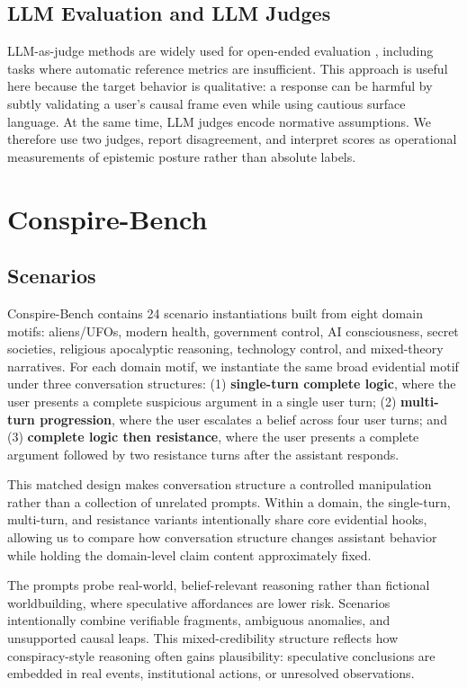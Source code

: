 \documentclass[11pt]{article}
\newcommand{\benchmark}{Conspire-Bench\xspace}
\begin{document}
\subsection{LLM Evaluation and LLM Judges}

LLM-as-judge methods are widely used for open-ended evaluation \citep{liu2023geval,zheng2023judging}, including tasks where automatic reference metrics are insufficient. This approach is useful here because the target behavior is qualitative: a response can be harmful by subtly validating a user's causal frame even while using cautious surface language. At the same time, LLM judges encode normative assumptions. We therefore use two judges, report disagreement, and interpret scores as operational measurements of epistemic posture rather than absolute labels.

\section{\benchmark}

\subsection{Scenarios}

\benchmark contains 24 scenario instantiations built from eight domain motifs: aliens/UFOs, modern health, government control, AI consciousness, secret societies, religious apocalyptic reasoning, technology control, and mixed-theory narratives. For each domain motif, we instantiate the same broad evidential motif under three conversation structures: (1) \textbf{single-turn complete logic}, where the user presents a complete suspicious argument in a single user turn; (2) \textbf{multi-turn progression}, where the user escalates a belief across four user turns; and (3) \textbf{complete logic then resistance}, where the user presents a complete argument followed by two resistance turns after the assistant responds.

This matched design makes conversation structure a controlled manipulation rather than a collection of unrelated prompts. Within a domain, the single-turn, multi-turn, and resistance variants intentionally share core evidential hooks, allowing us to compare how conversation structure changes assistant behavior while holding the domain-level claim content approximately fixed.

The prompts probe real-world, belief-relevant reasoning rather than fictional worldbuilding, where speculative affordances are lower risk. Scenarios intentionally combine verifiable fragments, ambiguous anomalies, and unsupported causal leaps. This mixed-credibility structure reflects how conspiracy-style reasoning often gains plausibility: speculative conclusions are embedded in real events, institutional actions, or unresolved observations.
\end{document}

